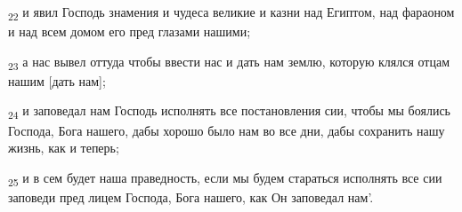 \begin{tcolorbox}
\textsubscript{22} и явил Господь знамения и чудеса великие и казни над Египтом, над фараоном и над всем домом его пред глазами нашими;
\end{tcolorbox}
\begin{tcolorbox}
\textsubscript{23} а нас вывел оттуда чтобы ввести нас и дать нам землю, которую клялся отцам нашим [дать нам];
\end{tcolorbox}
\begin{tcolorbox}
\textsubscript{24} и заповедал нам Господь исполнять все постановления сии, чтобы мы боялись Господа, Бога нашего, дабы хорошо было нам во все дни, дабы сохранить нашу жизнь, как и теперь;
\end{tcolorbox}
\begin{tcolorbox}
\textsubscript{25} и в сем будет наша праведность, если мы будем стараться исполнять все сии заповеди пред лицем Господа, Бога нашего, как Он заповедал нам'.
\end{tcolorbox}
